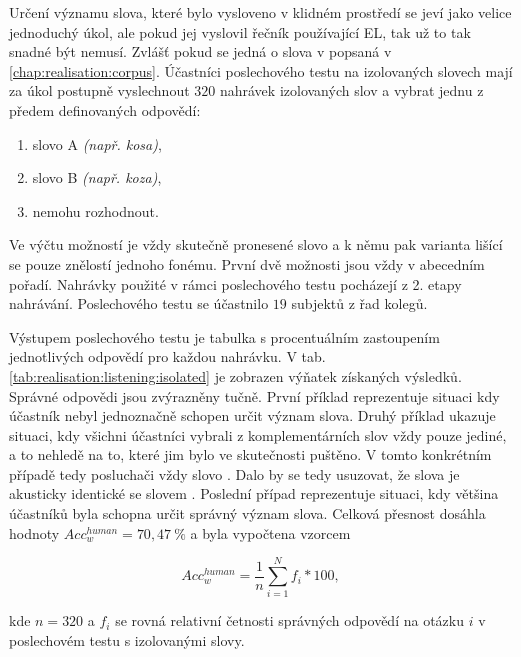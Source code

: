 Určení významu slova, které bylo vysloveno v klidném prostředí se jeví jako velice jednoduchý úkol, ale pokud jej vyslovil řečník používající EL, tak už to tak snadné být nemusí. Zvlášť pokud se jedná o slova v popsaná v \ref{chap:realisation:corpus}. Účastníci poslechového testu na izolovaných slovech mají za úkol postupně vyslechnout $320$ nahrávek izolovaných slov a vybrat jednu z předem definovaných odpovědí:

\begin{enumerate}[label=\alph*)]
  \item slovo A \textit{(např. kosa)},
  \item slovo B \textit{(např. koza)},
  \item nemohu rozhodnout.
\end{enumerate}

\noindent Ve výčtu možností je vždy skutečně pronesené slovo a k němu pak varianta lišící se pouze znělostí jednoho fonému. První dvě možnosti jsou vždy v abecedním pořadí. Nahrávky použité v rámci poslechového testu pocházejí z 2. etapy nahrávání. Poslechového testu se účastnilo $19$ subjektů z řad kolegů.

Výstupem poslechového testu je tabulka s procentuálním zastoupením jednotlivých odpovědí pro každou nahrávku. V tab. \ref{tab:realisation:listening:isolated} je zobrazen výňatek získaných výsledků. Správné odpovědi jsou zvýrazněny tučně. První příklad reprezentuje situaci kdy účastník nebyl jednoznačně schopen určit význam slova. Druhý příklad ukazuje situaci, kdy všichni účastníci vybrali z komplementárních slov vždy pouze jediné, a to nehledě na to, které jim bylo ve skutečnosti puštěno. V tomto konkrétním případě tedy posluchači vždy  slovo . Dalo by se tedy usuzovat, že slova  je akusticky identické se slovem . Poslední případ reprezentuje situaci, kdy většina účastníků byla schopna určit správný význam slova. Celková přesnost dosáhla hodnoty $Acc_w^{human} = 70,47\ \%$ a byla vypočtena vzorcem

\begin{equation}
  Acc_w^{human} = \frac{1}{n} \sum_{i=1}^{N} f_i * 100,
  \label{eq:realisation:accuracy:human}
\end{equation}

\noindent kde $n=320$ a $f_i$ se rovná relativní četnosti správných odpovědí na otázku $i$ v poslechovém testu s izolovanými slovy.

